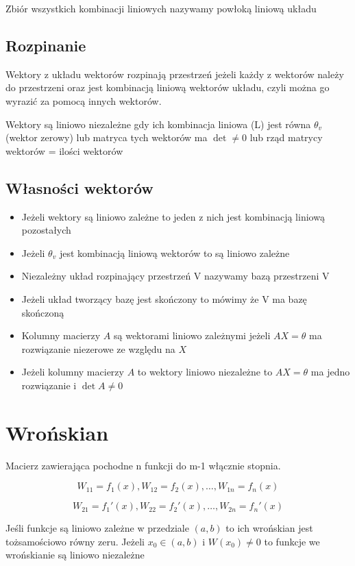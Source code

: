 \documentclass{../notatki}
\begin{document}
Zbiór wszystkich kombinacji liniowych nazywamy powłoką liniową układu

\subsection{Rozpinanie}

Wektory z układu wektorów rozpinają przestrzeń jeżeli każdy z
wektorów należy do przestrzeni oraz jest kombinacją liniową wektorów
układu, czyli można go wyrazić za pomocą innych wektorów.

Wektory są liniowo niezależne gdy ich kombinacja liniowa (L) jest
równa $\theta_v$(wektor zerowy) lub matryca tych wektorów ma $\det
\ne 0$ lub rząd matrycy wektorów = ilości wektorów

\subsection{Własności wektorów}

\begin{itemize}
  \item Jeżeli wektory są liniowo zależne to jeden z nich jest
    kombinacją liniową pozostałych
  \item Jeżeli $\theta_v$ jest kombinacją liniową wektorów to są liniowo zależne
  \item Niezależny układ rozpinający przestrzeń V nazywamy bazą przestrzeni V
  \item Jeżeli układ tworzący bazę jest skończony to mówimy że V ma
    bazę skończoną
  \item Kolumny macierzy $A$ są wektorami liniowo zależnymi jeżeli
    $AX = \theta$ ma rozwiązanie niezerowe ze względu na $X$
  \item Jeżeli kolumny macierzy $A$ to wektory liniowo niezależne to
    $AX = \theta$ ma jedno rozwiązanie i $\det A \ne 0$
\end{itemize}

\section{Wrońskian}

Macierz zawierająca pochodne n funkcji do m-1 włącznie stopnia.

$$
W_{11} = f_1(x), W_{12} = f_2(x), \dots, W_{1n} = f_n(x)
$$

$$
W_{21} = f_1'(x), W_{22} = f_2'(x), \dots, W_{2n} = f_n'(x)
$$

Jeśli funkcje są liniowo zależne w przedziale $(a,b)$ to ich
wrońskian jest tożsamościowo równy zeru.
Jeżeli $x_0 \in (a, b)$ i $W(x_0) \ne 0$ to funkcje we wrońskianie są
liniowo niezależne
\end{document}
